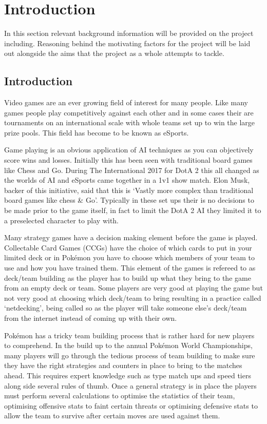 \documentclass[a4paper]{article}
\newcommand{\Pokemon}{Pok\'{e}mon}
\begin{document}
\pagebreak

\tableofcontents
\pagebreak
\setcounter{page}{1}

\section{Introduction}
In this section relevant background information will be provided on the project including.
Reasoning behind the motivating factors for the project will be laid out alongside the aims that the project as a whole attempts to tackle.
\subsection{Introduction}
\par
Video games are an ever growing field of interest for many people.
Like many games people play competitively against each other and in some cases their are tournaments on an international scale with whole teams set up to win the large prize pools\cite{eSportsPrize}\cite{teamEarnings}.
This field has become to be known as eSports.
\par
Game playing is an obvious application of AI techniques as you can objectively score wins and losses.
Initially this has been seen with traditional board games like Chess\cite{deepBlue} and Go\cite{alphaGo}.
During The International 2017 for DotA 2 this all changed as the worlds of AI and eSports came together in a 1v1 show match\cite{openAI}.
Elon Musk, backer of this initiative, said that this is `Vastly more complex than traditional board games like chess \& Go'\cite{openAI}.
Typically in these set ups their is no decisions to be made prior to the game itself, in fact to limit the DotA 2 AI they limited it to a preselected character to play with.
\par
Many strategy games have a decision making element before the game is played.
Collectable Card Games (CCGs) have the choice of which cards to put in your limited deck or in \Pokemon{} you have to choose which members of your team to use and how you have trained them.
This element of the games is refereed to as deck/team building as the player has to build up what they bring to the game from an empty deck or team.
Some players are very good at playing the game but not very good at choosing which deck/team to bring resulting in a practice called `netdecking', being called so as the player will take someone else's deck/team from the internet instead of coming up with their own.
\par
\Pokemon{} has a tricky team building process that is rather hard for new players to comprehend.
In the build up to the annual \Pokemon{} World Championships, many players will go through the tedious process of team building to make sure they have the right strategies and counters in place to bring to the matches ahead\cite{worldsOverview}.
This requires expert knowledge such as type match ups and speed tiers along side several rules of thumb.
Once a general strategy is in place the players must perform several calculations to optimise the statistics of their team, optimising offensive stats to faint certain threats or optimising defensive stats to allow the team to survive after certain moves are used against them.
\end{document}
